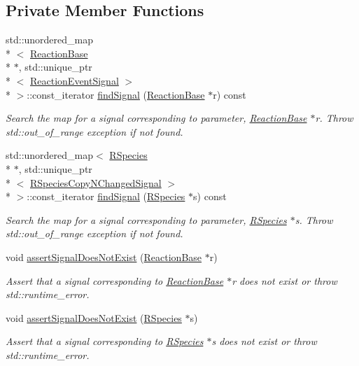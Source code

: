 \subsection*{Private Member Functions}
\begin{DoxyCompactItemize}
\item 
std\-::unordered\-\_\-map\\*
$<$ \hyperlink{classchem_1_1ReactionBase}{Reaction\-Base} \\*
$\ast$, std\-::unique\-\_\-ptr\\*
$<$ \hyperlink{namespacechem_a40bfcc5c8ae87e2713c68fae68215991}{Reaction\-Event\-Signal} $>$\\*
 $>$\-::const\-\_\-iterator \hyperlink{classchem_1_1ChemSignal_ac988afbd07af10fb3fc72f688adaef5e}{find\-Signal} (\hyperlink{classchem_1_1ReactionBase}{Reaction\-Base} $\ast$r) const 
\begin{DoxyCompactList}\small\item\em Search the map for a signal corresponding to parameter, \hyperlink{classchem_1_1ReactionBase}{Reaction\-Base} $\ast$r. Throw std\-::out\-\_\-of\-\_\-range exception if not found. \end{DoxyCompactList}\item 
std\-::unordered\-\_\-map$<$ \hyperlink{classchem_1_1RSpecies}{R\-Species} \\*
$\ast$, std\-::unique\-\_\-ptr\\*
$<$ \hyperlink{namespacechem_a6cb4144586460e7b7ae0dffdf08eb57c}{R\-Species\-Copy\-N\-Changed\-Signal} $>$\\*
 $>$\-::const\-\_\-iterator \hyperlink{classchem_1_1ChemSignal_ae10bf98b41aa071c0595c9ae2c320858}{find\-Signal} (\hyperlink{classchem_1_1RSpecies}{R\-Species} $\ast$s) const 
\begin{DoxyCompactList}\small\item\em Search the map for a signal corresponding to parameter, \hyperlink{classchem_1_1RSpecies}{R\-Species} $\ast$s. Throw std\-::out\-\_\-of\-\_\-range exception if not found. \end{DoxyCompactList}\item 
void \hyperlink{classchem_1_1ChemSignal_ae823c2e49c5dcd6eefe8e44d8628622a}{assert\-Signal\-Does\-Not\-Exist} (\hyperlink{classchem_1_1ReactionBase}{Reaction\-Base} $\ast$r)
\begin{DoxyCompactList}\small\item\em Assert that a signal corresponding to \hyperlink{classchem_1_1ReactionBase}{Reaction\-Base} $\ast$r does not exist or throw std\-::runtime\-\_\-error. \end{DoxyCompactList}\item 
void \hyperlink{classchem_1_1ChemSignal_a20c30365e810b3b88e87500e08627d11}{assert\-Signal\-Does\-Not\-Exist} (\hyperlink{classchem_1_1RSpecies}{R\-Species} $\ast$s)
\begin{DoxyCompactList}\small\item\em Assert that a signal corresponding to \hyperlink{classchem_1_1RSpecies}{R\-Species} $\ast$s does not exist or throw std\-::runtime\-\_\-error. \end{DoxyCompactList}\end{DoxyCompactItemize}
